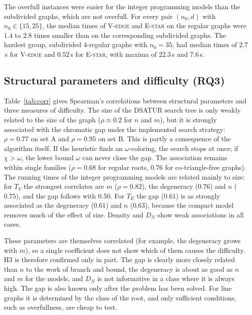 \documentclass[11pt,a4paper]{article}
\newcommand{\Vedge}{\textsc{V-edge}}
\newcommand{\Estar}{\textsc{E-star}}
\begin{document}
The overfull instances were easier for the integer programming models than
the subdivided graphs, which are not overfull. For every pair $(n_0,d)$ with
$n_0\in\{15,25\}$, the median times of \Vedge{} and \Estar{} on the regular
graphs were $1.4$ to $2.8$ times smaller than on the corresponding subdivided
graphs. The hardest group, subdivided $4$-regular graphs with $n_0=35$, had
median times of $2.7$\,s for \Vedge{} and $0.52$\,s for \Estar, with maxima of
$22.3$\,s and $7.6$\,s.

\begin{table}[!tb]
\centering\small
\caption{Line graphs of set A by the class of the root graph.}
\label{tab:classes}
\resizebox{\textwidth}{!}{}
\end{table}

\subsection{Structural parameters and difficulty (RQ3)}

Table~\ref{tab:corr} gives Spearman's correlations between structural
parameters and three measures of difficulty. The size of the DSATUR search tree
is only weakly related to the size of the graph ($\rho\approx 0.2$ for $n$ and
$m$), but it is strongly associated with the chromatic gap under the
implemented search strategy: $\rho=0.77$ on set A and $\rho=0.95$ on set B. This
is partly a consequence of the algorithm itself. If the heuristic finds an
$\omega$-coloring, the search stops at once; if $\chi>\omega$, the lower bound
$\omega$ can never close the gap. The association remains within single
families ($\rho=0.68$ for regular roots, $0.76$ for co-triangle-free graphs).
The running times of the integer programming models are related mainly to
size: for $T_V$ the strongest correlates are $m$ ($\rho=0.82$), the degeneracy
($0.76$) and $n$ ($0.75$), and the gap follows with $0.50$. For $T_E$ the gap
($0.61$) is as strongly associated as the degeneracy ($0.61$) and $n$
($0.63$), because the compact model removes much of the effect of size.
Density and $D_N$ show weak associations in all cases.

These parameters are themselves correlated (for example, the degeneracy grows
with $m$), so a single coefficient does not show which of them causes the
difficulty. H3 is therefore confirmed only in part. The gap is clearly more
closely related than $n$ to the work of branch and bound, the degeneracy is
about as good as $n$ and $m$ for the models, and $D_N$ is not informative in a
class where it is always high. The gap is also known only after the problem
has been solved. For line graphs it is determined by the class of the root,
and only sufficient conditions, such as overfullness, are cheap to test.
\end{document}
